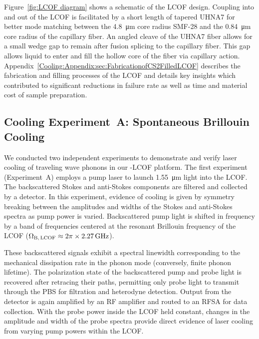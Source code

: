 Figure~\ref{fig:LCOF diagram} shows a schematic of the \ac{LCOF} design. Coupling into and out of the \ac{LCOF} is facilitated by a short length of tapered \ac{UHNA7} for better mode matching between the \SI{4.8}{\micro\meter} core radius \ac{SMF-28} and the \SI{0.84}{\micro\meter} core radius of the capillary fiber. An angled cleave of the \ac{UHNA7} fiber allows for a small wedge gap to remain after fusion splicing to the capillary fiber. This gap allows liquid  to enter and fill the hollow core of the fiber via capillary action. Appendix~\ref{Cooling:Appendix:sec:FabricationofCS2FilledLCOF} describes the fabrication and filling processes of the \ac{LCOF} and details key insights which contributed to significant reductions in failure rate as well as time and material cost of sample preparation.


\subsection{Cooling Experiment~A: Spontaneous Brillouin Cooling}
\label{Cooling:subsec:ExperimentASpontaneousBrillouinCooling}

We conducted two independent experiments to demonstrate and verify laser cooling of traveling wave phonons in our -\ac{LCOF} platform. The first experiment (Experiment~A) employs a pump laser to launch \SI{1.55}{\micro\meter} light into the \ac{LCOF}. The backscattered Stokes and anti-Stokes components are filtered and collected by a detector. In this experiment, evidence of cooling is given by symmetry breaking between the amplitudes and widths of the Stokes and anti-Stokes spectra as pump power is varied. Backscattered pump light is shifted in frequency by a band of frequencies centered at the resonant Brillouin frequency of the \ac{LCOF} (\(\Omega_{\rm B,\,LCOF} \approx 2\pi\times\SI{2.27}{\giga\hertz}\)).

These backscattered signals exhibit a spectral linewidth corresponding to the mechanical dissipation rate in the phonon mode (conversely, finite phonon lifetime). The polarization state of the backscattered pump and probe light is recovered after retracing their paths, permitting only probe light to transmit through the \ac{PBS} for filtration and heterodyne detection. Output from the detector is again amplified by an \ac{RF} amplifier and routed to an \ac{RFSA} for data collection. With the probe power inside the \ac{LCOF} held constant, changes in the amplitude and width of the probe spectra provide direct evidence of laser cooling from varying pump powers within the \ac{LCOF}.

